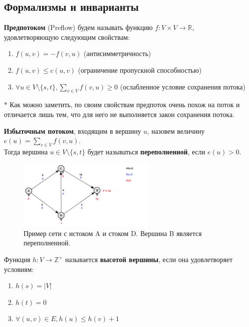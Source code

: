     \subsection{Формализмы и инварианты}

    \begin{definition}
        \textbf{Предпотоком} (Preflow) будем называть функцию $f:V\times V\rightarrow \mathbb{R}$, удовлетворяющую следующим свойствам:
        \begin{enumerate}
            \item $f(u,v)=-f(v,u)$ (антисимметричность)
            \item $f(u,v)\leq c(u,v)$ (ограничение пропускной способностью)
            \item $\forall u\in V\setminus\{s,t\}, \sum\limits_{v\in V} f(v,u)\geq 0$ (ослабленное условие сохранения потока)
        \end{enumerate}
        $\ast$ Как можно заметить, по своим свойствам предпоток очень похож на поток и отличается лишь тем, что для него не выполняется закон сохранения потока.
        
    \end{definition}

    \begin{definition}
        \textbf{Избыточным потоком}, входящим в вершину $u$, назовем величину $e(u)=\sum\limits_{v\in V} f(v,u)$.\\ Тогда вершина $u\in V\setminus\{s,t\}$ будет называться \textbf{переполненной}, если $e(u)>0$.
    \end{definition}
    \begin{figure}[H]
                \centering
                \includegraphics[width=0.6\textwidth]{images/chapter8/OrGraphExample.png}
                \caption{Пример сети с истоком A и стоком D. Вершина B является переполненной.}
                \label{fig:images/chapter8/OrGraphExample.png}
    \end{figure}

    \begin{definition}
        Функция $h:V\rightarrow \mathbb{Z}^+$ называется \textbf{высотой вершины}, если она удовлетворяет условиям:
        \begin{enumerate}
            \item $h(s)=|V|$
            \item $h(t)=0$
            \item $\forall (u,v)\in E, h(u)\leq h(v)+1$
        \end{enumerate}
        \hline
    \end{definition}\\

